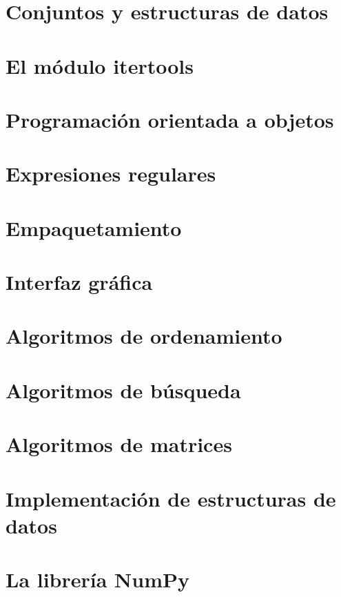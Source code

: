 \documentclass{article}
\begin{document}
    \section{Conjuntos y estructuras de datos}

    \section{El módulo itertools}

    \section{Programación orientada a objetos}

    \section{Expresiones regulares}

    \section{Empaquetamiento}

    \section{Interfaz gráfica}

    \section{Algoritmos de ordenamiento}

    \section{Algoritmos de búsqueda}

    \section{Algoritmos de matrices}

    \section{Implementación de estructuras de datos}

    \section{La librería NumPy}
\end{document}
